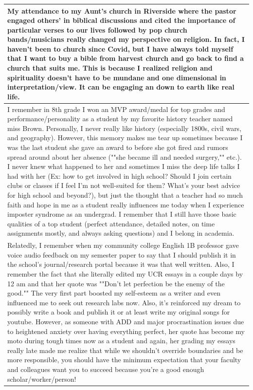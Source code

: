 \documentclass[
  .7em,
  letterpaper,
  DIV=11,
  numbers=noendperiod]{scrartcl}
\begin{document}
\begin{table}
\begin{tabular}{l}
\hline
My attendance to my Aunt's church in Riverside where the pastor engaged others' in biblical discussions and cited the importance of particular verses to our lives followed by pop church bands/musicians really changed my perspective on religion. In fact, I haven't been to church since Covid, but I have always told myself that I want to buy a bible from harvest church and go back to find a church that suits me. This is because I realized religion and spirituality doesn't have to be mundane and one dimensional in interpretation/view. It can be engaging an down to earth like real life.\\
\hline
I remember in 8th grade I won an MVP award/medal for top grades and performance/personality as a student by my favorite history teacher named miss Brown. Personally, I never really like history (especially 1800s, civil wars, and geography). However, this memory makes me tear up sometimes because I was the last student she gave an award to before she got fired and rumors spread around about her absence (""she became ill and needed surgery,"" etc.). I never knew what happened to her and sometimes I miss the deep life talks I had with her (Ex: how to get involved in high school? Should I join certain clubs or classes if I feel I'm not well-suited for them? What's your best advice for high school and beyond?), but just the thought that a teacher had so much faith and hope in me as a student really influences me today when I experience imposter syndrome as an undergrad. I remember that I still have those basic qualities of a top student (perfect attendance, detailed notes, on time assignments mostly, and always asking questions) and I belong in academia.\\
\hline
Relatedly, I remember when my community college English 1B professor gave voice audio feedback on my semester paper to say that I should publish it in the school's journal/research portal because it was that well written. Also, I remember the fact that she literally edited my UCR essays in a couple days by 12 am and that her quote was ""Don't let perfection be the enemy of the good."" The very first part boosted my self-esteem as a writer and even influenced me to seek out research labs now. Also, it's reinforced my dream to possibly write a book and publish it or at least write my original songs for youtube. However, as someone with ADD and major procrastination issues due to heightened anxiety over having everything perfect, her quote has become my moto during tough times now as a student and again, her grading my essays really late made me realize that while we shouldn't override boundaries and be more responsible, you should have the minimum expectation that your faculty and colleagues want you to succeed because you're a good enough scholar/worker/person!\\

\end{tabular}
\end{table}
\end{document}
